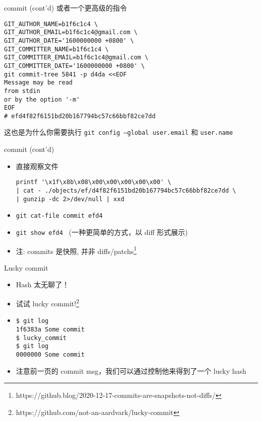 \documentclass[aspectratio=169]{beamer}
\newcommand{\T}[1]{\texttt{#1}}
\begin{document}
\begin{frame}[fragile]{commit (cont'd)}
  或者一个更高级的指令\begin{verbatim}
GIT_AUTHOR_NAME=b1f6c1c4 \
GIT_AUTHOR_EMAIL=b1f6c1c4@gmail.com \
GIT_AUTHOR_DATE='1600000000 +0800' \
GIT_COMMITTER_NAME=b1f6c1c4 \
GIT_COMMITTER_EMAIL=b1f6c1c4@gmail.com \
GIT_COMMITTER_DATE='1600000000 +0800' \
git commit-tree 5841 -p d4da <<EOF
Message may be read
from stdin
or by the option '-m'
EOF
# efd4f82f6151bd20b167794bc57c66bbf82ce7dd
\end{verbatim}
  这也是为什么你需要执行 \T{git config --global user.email} 和 \T{user.name}
\end{frame}

\begin{frame}[fragile]{commit (cont'd)}
  \begin{itemize}
    \item<1-> 直接观察文件\begin{verbatim}
printf '\x1f\x8b\x08\x00\x00\x00\x00\x00' \
| cat - ./objects/ef/d4f82f6151bd20b167794bc57c66bbf82ce7dd \
| gunzip -dc 2>/dev/null | xxd
\end{verbatim}
    \item<2-> \T{git cat-file commit efd4}
    \item<3-> \T{git show efd4~} (一种更简单的方式，以 diff 形式展示)
    \item<3-> 注: commits 是快照, 并非 diffs/patchs\footnote{https://github.blog/2020-12-17-commits-are-snapshots-not-diffs/}
  \end{itemize}
\end{frame}

\begin{frame}[fragile]{Lucky commit}
  \begin{itemize}
    \item Hash 太无聊了！
    \item 试试 lucky commit!\footnote{https://github.com/not-an-aardvark/lucky-commit}
    \item \begin{verbatim}
$ git log
1f6383a Some commit
$ lucky_commit
$ git log
0000000 Some commit
\end{verbatim}
    \item 注意前一页的 commit msg，我们可以通过控制他来得到了一个 lucky hash
  \end{itemize}
\end{frame}
\end{document}
